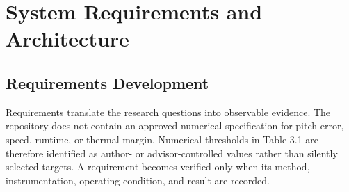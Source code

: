 \chapter{System Requirements and Architecture}\label{ch:system-requirements-and-architecture}

\section{Requirements Development}\label{requirements-development}

Requirements translate the research questions into observable evidence.
The repository does not contain an approved numerical specification for
pitch error, speed, runtime, or thermal margin. Numerical thresholds in
Table 3.1 are therefore identified as author- or advisor-controlled
values rather than silently selected targets. A requirement becomes
verified only when its method, instrumentation, operating condition, and
result are recorded.


